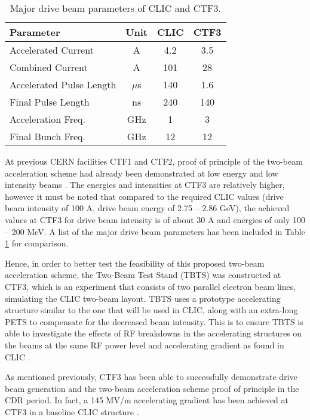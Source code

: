 \begin{table}[!htb]
\begin{center}
\begin{tabular}{l | c | c | c}
\textbf{Parameter}                & \textbf{Unit}    & \textbf{CLIC} & \textbf{CTF3} \\ \hline
    Accelerated Current      & A       & 4.2  & 3.5  \\
    Combined Current         & A       & 101  & 28   \\
    Accelerated Pulse Length & $\mu$s & 140  & 1.6  \\
    Final Pulse Length       & ns      & 240  & 140  \\
    Acceleration Freq.       & GHz     & 1    & 3    \\
    Final Bunch Freq.        & GHz     & 12   & 12   \\
\end{tabular}
\caption{Major drive beam parameters of CLIC and CTF3. \cite{CLIC:Concept}}
\label{tab:CLIC:Feasi2}
\end{center}
\end{table}

At previous CERN facilities CTF1 and CTF2, proof of principle of the two-beam acceleration scheme had already been demonstrated at low energy and low intensity beams \cite{Nuclear:CTF3}. The energies and intensities at CTF3 are relatively higher, however it must be noted that compared to the required CLIC values (drive beam intensity of 100 A, drive beam energy of 2.75 – 2.86 GeV), the achieved values at CTF3 for drive beam intensity is of about 30 A and energies of only 100 – 200 MeV. A list of the major drive beam parameters has been included in Table \ref{tab:CLIC:Feasi2} for comparison.

Hence, in order to better test the feasibility of this proposed two-beam acceleration scheme, the Two-Beam Test Stand (TBTS) \cite{Nuclear:CTF3} was constructed at CTF3, which is an experiment that consists of two parallel electron beam lines, simulating the CLIC two-beam layout. TBTS uses a prototype accelerating structure similar to the one that will be used in CLIC, along with an extra-long PETS to compensate for the decreased beam intensity. This is to ensure TBTS is able to investigate the effects of RF breakdowns in the accelerating structures on the beams at the same RF power level and accelerating gradient as found in CLIC \cite{Nuclear:CTF3}.

As mentioned previously, CTF3 has been able to successfully demonstrate drive beam generation and the two-beam acceleration scheme proof of principle in the CDR period. In fact, a 145 MV/m accelerating gradient has been achieved at CTF3 in a baseline CLIC structure \cite{CLIC:Concept}.

